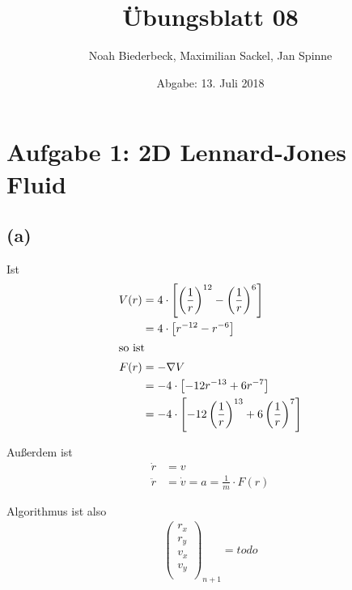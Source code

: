 \documentclass{scrartcl}
\title{Übungsblatt 08}
\author{%
		Noah Biederbeck, Maximilian Sackel, Jan Spinne
}
\date{Abgabe: 13. Juli 2018}
\begin{document}
\maketitle
\section*{Aufgabe 1: 2D Lennard-Jones Fluid}
\subsection*{(a)}

Ist
\begin{align*}
  V(r) &= 4 \cdot \left[\left(\frac{1}{r}\right)^{12} - \left(\frac{1}{r}\right)^{6}\right] \\
       &= 4 \cdot \left[{r}^{-12} - {r}^{-6}\right] \\
  \intertext{so ist}
  F(r) &= - \nabla V \\
       &= - 4 \cdot \left[-12 {r}^{-13} + 6 {r}^{-7}\right] \\
       &= - 4 \cdot \left[- 12 \left(\frac{1}{r}\right)^{13} + 6 \left(\frac{1}{r}\right)^{7}\right] \\
\end{align*}

Außerdem ist
\begin{align*}
  \dot{r} &= v \\
  \ddot{r} &= \dot{v} = a = \frac{1}{m} \cdot F(r)
\end{align*}

Algorithmus ist also
\begin{align*}
  \left(\begin{matrix} r_x \\ r_y \\ v_x \\ v_y \\ \end{matrix}\right)_{n+1} = todo
\end{align*}
\end{document}
